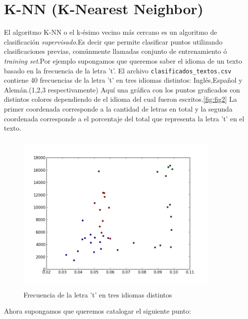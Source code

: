 \documentclass{article}
\begin{document}
\section{K-NN (K-Nearest Neighbor)}
El algoritmo K-NN o el k-ésimo vecino más cercano es un algoritmo de clasificación \textit{supervisado}.Es decir que permite clasificar puntos utilizando clasificaciones previas, comúnmente llamadas conjunto de entrenamiento ó \textit{training set}.Por ejemplo supongamos que queremos saber el idioma de un texto basado en la frecuencia de la letra 't'. El archivo \verb#clasificados_textos.csv# contiene 40 frecuencias de la letra 't' en tres idiomas distintos: Inglés,Español y Alemán.(1,2,3 respectivamente)
Aquí una gráfica con los puntos graficados con distintos colores dependiendo de el idioma del cual fueron escritos.\autoref{fig:fig2}
La primer coordenada corresponde a la cantidad de letras en total y la segunda coordenada corresponde a el porcentaje del total que representa la letra 't' en el texto.


\begin{figure}[h]
\centering
\includegraphics[width=10cm, height=8cm]{idiomas.png}
\caption{Frecuencia de la letra 't' en tres idiomas distintos }

\label{fig:fig2}
\end{figure}
Ahora supongamos que queremos catalogar el siguiente punto:
\end{document}
